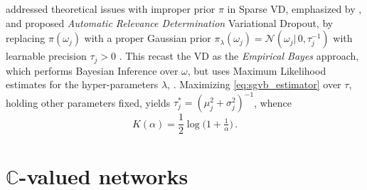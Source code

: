 \documentclass[a4paper,10pt,twocolumn]{article}
\newcommand{\cplx}{\mathbb{C}}
\begin{document}
\citet{kharitonov_variational_2018} addressed theoretical issues with improper prior
$\pi$ in Sparse VD, emphasized by \citet{hron_variational_2018}, and proposed
\emph{Automatic Relevance Determination} Variational Dropout, by replacing $\pi(\omega_j)$
with a proper Gaussian prior $
  \pi_\lambda(\omega_j) = \mathcal{N}(\omega_j \vert\, 0, \tau_j^{-1})
$ with learnable precision $\tau_j > 0$ \citep{neal_bayesian_1996}. This recast the VD
as the \emph{Empirical Bayes} approach, which performs Bayesian Inference over $\omega$,
but uses Maximum Likelihood estimates for the hyper-parameters $\lambda$,
\citep{mackay_bayesian_1994}. Maximizing \eqref{eq:sgvb_estimator} over $\tau$, holding
other parameters fixed, yields $
  \tau^*_j = {(\mu_j^2 + \sigma^2_j)}^{-1}
$, whence
\begin{equation}  \label{eq:ard-kl-div-real}
  K(\alpha)
    = \frac12 \log{\bigl(1 + \tfrac1{\alpha} \bigr)}
    \,.
\end{equation}





\section{$\cplx$-valued networks} %
\label{sec:c_valued_networks}
\end{document}
